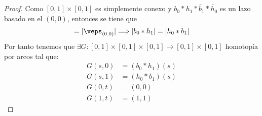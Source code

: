 \begin{lema}
\begin{proof}
        Como $[0,1]\times [0,1]$ es simplemente conexo y $b_0\ast h_1 \ast \tilde{b_1} \ast \tilde{h_0}$ es un lazo basado en el $(0,0)$, entonces se tiene que 
        \begin{gather*}
            [b_0\ast h_1 \ast \tilde{b_1} \ast \tilde{h_0}] = [\veps_{(0,0)}] \Longrightarrow [b_0\ast h_1] = [h_0\ast b_1]
        \end{gather*}
        Por tanto tenemos que $\exists G:[0,1]\times[0,1]\times [0,1] \to [0,1]\times[0,1]$ homotopía por arcos tal que:
        \begin{align*}
            G(s,0) &= (b_0\ast h_1)(s)\\
            G(s,1) &= (h_0\ast b_1)(s)\\
            G(0,t) &= (0,0)\\
            G(1,t) &= (1,1)
        \end{align*}
        

\end{proof}
\end{lema}
